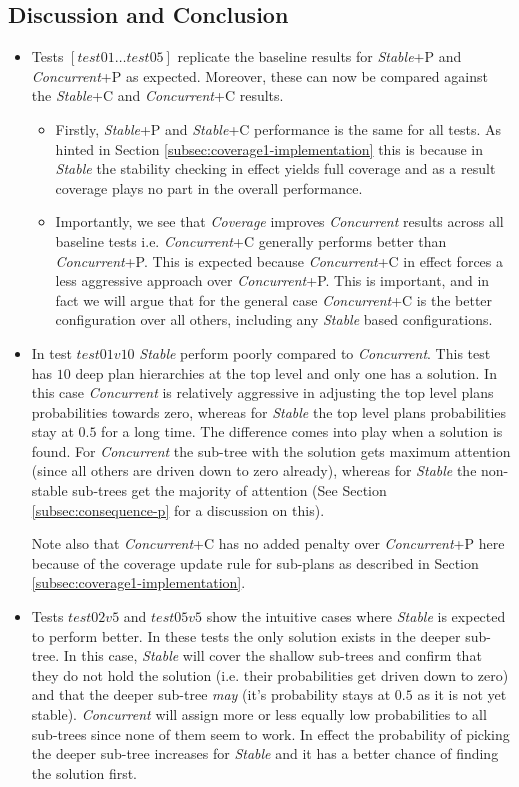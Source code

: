 \documentclass[a4paper]{article}
\newcommand{\cc}{\emph{Concurrent}\xspace}
\newcommand{\st}{\emph{Stable}\xspace}
\newcommand{\cov}{\emph{Coverage}\xspace}
\begin{document}
\subsection{Discussion and Conclusion}

\begin{itemize}

\item Tests $[test01 \ldots test05]$ replicate the baseline results for {\st}+P and {\cc}+P as expected. Moreover, these can now be compared against the {\st}+C and {\cc}+C results.
\begin{itemize}
\item Firstly, {\st}+P and {\st}+C performance is the same for all tests. As hinted in Section \ref{subsec:coverage1-implementation} this is because in \st the stability checking in effect yields full coverage and as a result coverage plays no part in the overall performance.
\item Importantly, we see that \cov improves \cc results across all baseline tests i.e. {\cc}+C generally performs better than {\cc}+P. This is expected because {\cc}+C in effect forces a less aggressive approach over {\cc}+P. This is important, and in fact we will argue that for the general case {\cc}+C is the better configuration over all others, including any \st based configurations.
\end{itemize}

\item In test $test01v10$ \st perform poorly compared to \cc. This test has $10$ deep plan hierarchies at the top level and only one has a solution. In this case \cc is relatively aggressive in adjusting the top level plans probabilities towards zero, whereas for \st the top level plans probabilities stay at $0.5$ for a long time. The difference comes into play when a solution is found. For \cc the sub-tree with the solution gets maximum attention (since all others are driven down to zero already), whereas for \st the non-stable sub-trees get the majority of attention (See Section \ref{subsec:consequence-p} for a discussion on this). 

Note also that {\cc}+C has no added penalty over {\cc}+P here because of the coverage update rule for sub-plans as described in Section \ref{subsec:coverage1-implementation}.

\item Tests $test02v5$ and $test05v5$ show the intuitive cases where \st is expected to perform better. In these tests the only solution exists in the deeper sub-tree. In this case, \st will cover the shallow sub-trees and confirm that they do not hold the solution (i.e. their probabilities get driven down to zero) and that the deeper sub-tree \emph{may} (it's probability stays at $0.5$ as it is not yet stable). \cc will assign more or less equally low probabilities to all sub-trees since none of them seem to work. In effect the probability of picking the deeper sub-tree increases for \st and it has a better chance of finding the solution first. 


\end{itemize}
\end{document}
